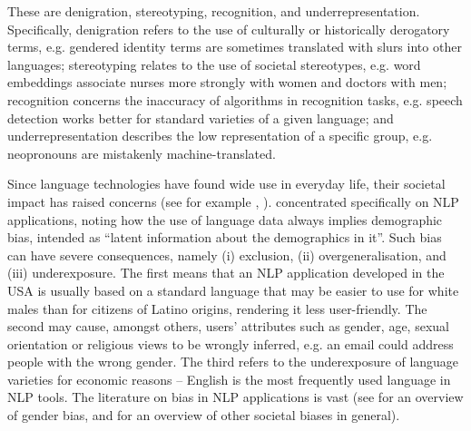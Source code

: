 
These are denigration, stereotyping, recognition, and underrepresentation. Specifically, denigration refers to the use of culturally or historically derogatory terms, e.g. gendered identity terms are sometimes translated with slurs into other languages; stereotyping relates to the use of societal stereotypes, e.g. word embeddings associate nurses more strongly with women and doctors with men; recognition concerns the inaccuracy of algorithms in recognition tasks, e.g. speech detection works better for standard varieties of a given language; and underrepresentation describes the low representation of a specific group, e.g. neopronouns are mistakenly machine-translated. 


Since language technologies have found wide use in everyday life, their societal impact has raised concerns (see for example \cite{hovy2016social}, \cite{blodgett-etal-2020-language}). \textcite[593]{hovy2016social} concentrated specifically on NLP applications, noting how the use of language data always implies demographic bias, intended as ``latent information about the demographics in it''. Such bias can have severe consequences, namely (i) exclusion, (ii) overgeneralisation, and (iii) underexposure. The first means that an NLP application developed in the USA is usually based on a standard language that may be easier to use for white males than for citizens of Latino origins, rendering it less user-friendly. The second may cause, amongst others, users' attributes such as gender, age, sexual orientation or religious views to be wrongly inferred, e.g. an email could address people with the wrong gender. The third refers to the underexposure of language varieties for economic reasons -- English is the most frequently used language in NLP tools. The literature on bias in NLP applications is vast (see \cite{sun2019mitigating} for an overview of gender bias, and \cite{hutchinson-etal-2020-social} for an overview of other societal biases in general). %



